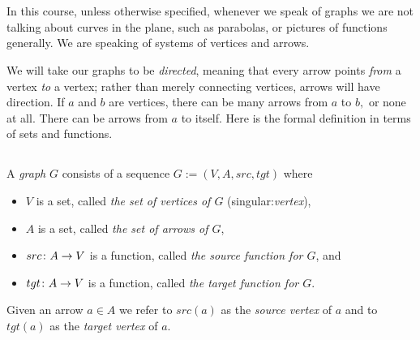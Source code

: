 \documentclass[../main/CT4S-EN-RU]{subfiles}
\begin{document}
\section{}\label{sec:graphs}

\begin{blockENG}
In this course, unless otherwise specified, whenever we speak of graphs we are not talking about curves in the plane, such as parabolas, or pictures of functions generally. We are speaking of systems of vertices and arrows.
\end{blockENG}

\begin{blockRUS}
\end{blockRUS}

\begin{blockENG}
We will take our graphs to be {\em directed}, meaning that every arrow points {\em from} a vertex {\em to} a vertex; rather than merely connecting vertices, arrows will have direction. If $a$ and $b$ are vertices, there can be many arrows from $a$ to $b,$ or none at all. There can be arrows from $a$ to itself. Here is the formal definition in terms of sets and functions.
\end{blockENG}


\subsection{}

\begin{definitionENG}\label{def:graph}
A {\em graph} $G$ consists of a sequence $G:=(V,A,src,tgt)$ where 
\begin{itemize}
\item $V$ is a set, called {\em the set of vertices of $G$} (singular:{\em vertex}),
\item $A$ is a set, called {\em the set of arrows of $G$},
\item $src\colon A\rightarrow V$ is a function, called {\em the source function for $G$}, and
\item $tgt\colon A\rightarrow V$ is a function, called {\em the target function for $G$}.
\end{itemize}
Given an arrow $a\in A$ we refer to $src(a)$ as the {\em source vertex} of $a$ and to $tgt(a)$ as the {\em target vertex} of $a.$
\end{definitionENG}
\end{document}
